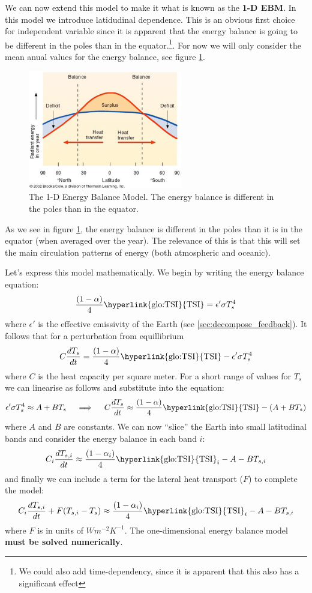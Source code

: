 We can now extend this model to make it what is known as the \textbf{1-D \gls{EBM}}.
In this model we introduce latidudinal dependence. This is an obvious first choice
for independent variable since it is apparent that the energy balance is going 
to be different in the poles than in the equator.\footnote{We could also add
time-dependency, since it is apparent that this also has a significant effect}.
For now we will only consider the mean anual values for the energy balance, see
figure \ref{fig:1D-EBM}.

\begin{figure}[h]
    \centering
    \includegraphics[width=0.6\textwidth]{figures/1debm.png}
    \caption{The 1-D Energy Balance Model. The energy balance is different in the
    poles than in the equator.}
    \label{fig:1D-EBM}
\end{figure}

As we see in figure \ref{fig:1D-EBM}, the energy balance is different in the
poles than it is in the equator (when averaged over the year). The relevance of 
this is that this will set the main circulation patterns of energy (both 
atmospheric and oceanic).

Let's express this model mathematically. We begin by writing the energy balance
equation:
$$
\frac{(1-\alpha)}{4} \text{\hyperlink{glo:TSI}{TSI}} = \epsilon'\sigma T_s^4
$$
where $\epsilon'$ is the effective emissivity of the Earth (see
\ref{sec:decompose_feedback}). It follows that for a perturbation from equillibrium
$$
C \frac{dT_s}{dt} = \frac{(1-\alpha)}{4} \text{\hyperlink{glo:TSI}{TSI}} - 
\epsilon'\sigma T_s^4
$$
where $C$ is the heat capacity per square meter. For a short range of values for
$T_s$ we can linearise as follows and substitute into the equation:
$$
\epsilon' \sigma T_s^4 \approx A + BT_s \quad \implies \quad C \frac{dT_s}{dt} 
\approx \frac{(1-\alpha)}{4} \text{\hyperlink{glo:TSI}{TSI}} - (A + BT_s)
$$
where $A$ and $B$ are constants. We can now ``slice'' the Earth into small 
latitudinal bands and consider the energy balance in each band $i$:
$$
C_i \frac{dT_{s,i}}{dt} \approx \frac{(1-\alpha_i)}{4} 
\text{\hyperlink{glo:TSI}{TSI}}_i - A - BT_{s,i}
$$
and finally we can include a term for the lateral heat transport ($F$) to complete
the model:
$$
C_i \frac{dT_{s,i}}{dt} + F(T_{s, i} - T_s) \approx \frac{(1-\alpha_i)}{4} 
\text{\hyperlink{glo:TSI}{TSI}}_i - A - BT_{s,i}
$$
where $F$ is in units of $Wm^{-2}K^{-1}$. The one-dimensional energy balance
model \textbf{must be solved numerically}.

